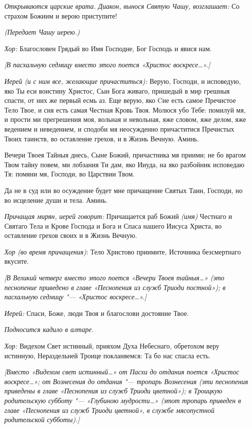 \begin{mymulticols}
{\itshape Открываются царские врата. Диакон, вынося Святую Чашу, возглашает:} Со страхом Божиим и верою приступите! 

{\itshape (Передает Чашу иерею.) }

{\itshape Хор:} Благословен Грядый во Имя Господне, Бог Господь и явися нам.

{\itshape [В пасхальную седмицу вместо этого поется «Христос воскресе…».]}

{\itshape Иерей (и с ним все, желающие причаститься):} Верую, Господи, и исповедую, яко Ты еси воистину Христос, Сын Бога живаго, пришедый в мир грешныя спасти, от них же первый есмь аз. Еще верую, яко Cие есть самое Пречистое Тело Твое, и сия есть самая Честная Кровь Твоя. Молюся убо Тебе: помилуй мя, и прости ми прегрешения моя, вольная и невольная, яже словом, яже делом, яже ведением и неведением, и сподоби мя неосужденно причаститися Пречистых Твоих таинств, во оставление грехов, и в Жизнь Вечную. Аминь.

Вечери Твоея Тайныя днесь, Сыне Божий, причастника мя приими; не бо врагом Твом тайну повем, ми лобзания Ти дам, яко Ииуда, на яко разбойник исповедаю Тя: помяни мя, Господи, во Царствии Твом.

Да не в суд или во осуждение будет мне причащение Святых Таин, Господи, но во исцеление души и тела. Аминь.


{\itshape Причащая мирян, иерей говорит:} Причащается раб Божий {\itshape (имя)} Честнаго и Святаго Тела и Крове Господа и Бога и Спаса нашего Иисуса Христа, во оставление грехов своих и в Жизнь Вечную. 

{\itshape Хор (во время причащения)}: Тело Христово приимите, Источника безсмертнаго вкусите.

{\itshape [В Великий четверг вместо этого поется «Вечери Твоея тайныя…» (это песнопение приведено в главе «Песнопения из служб Триоди постной»); в пасхальную седмицу "--- «Христос воскресе…».]}

{\itshape Иерей:} Спаси, Боже, люди Твоя и благослови достояние Твое.

{\itshape Подносится кадило в алтаре.} 

{\itshape Хор:} Видехом Свет истинный, прияхом Духа Небеснаго, обретохом веру истинную, Нераздельней Троице покланяемся: Та бо нас спасла есть.

{\itshape [Вместо «Видехом свет истинный…» от Пасхи до отдания поется «Христос воскресе…»; от Вознесения до отдания "--- тропарь Вознесения (эти песнопения приведены в главе «Песнопения из служб Триоди цветной»); в Троицкую родительскую субботу "--- «Глубиною мудрости…» (этот тропарь приведен в главе «Песнопения из служб Триоди цветной», в службе мясопустной родительской субботы).]}


\end{mymulticols}
